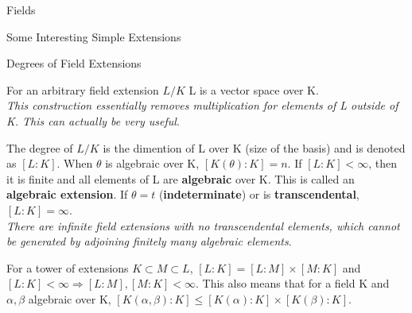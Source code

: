 \documentclass[12pt, letterpaper]{article}
\begin{document}
\begin{section}{Fields}
\begin{subsection}{Some Interesting Simple Extensions}
  \end{subsection}

  \begin{subsection}{Degrees of Field Extensions}

    For an arbitrary field extension \(L / K\) L is a vector space over K. \\
    \textit{This construction essentially removes multiplication for elements
      of L outside of K. This can actually be very useful}.

    The degree of \(L / K\) is the dimention of L over K (size of the basis)
    and is denoted as \([L : K]\). When \(\theta\) is algebraic over K,
    \([K(\theta) : K] = n\). If \([L : K] < \infty\), then it is finite and
    all elements of L are \textbf{algebraic} over K. This is called an
    \textbf{algebraic extension}. If \(\theta = t\) (\textbf{indeterminate}) or
    is \textbf{transcendental}, \([L : K] = \infty\). \\
    \textit{There are infinite field extensions with no transcendental
      elements, which cannot be generated by adjoining finitely many algebraic
      elements}.

    For a tower of extensions \(K \subset M \subset L\), \([L : K] =
    [L : M] \times [M : K]\) and \([L : K] < \infty \Rightarrow [L : M],
    [M : K] < \infty\). This also means that for a field K and \(\alpha,
    \beta\) algebraic over K, \([K(\alpha, \beta) : K] \leq
    [K(\alpha) : K] \times [K(\beta) : K]\).

  \end{subsection}

\end{section}
\end{document}
